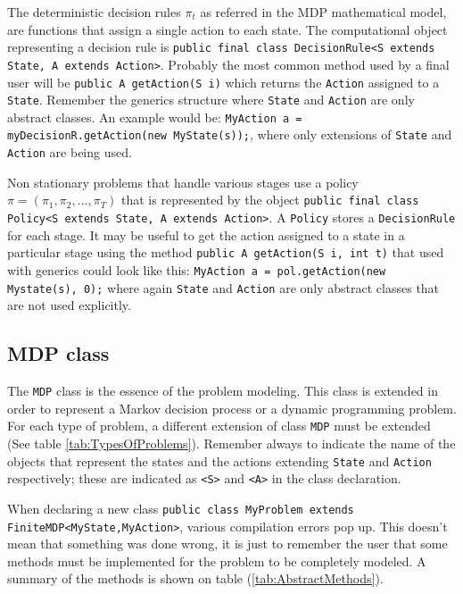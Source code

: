 \documentclass[11pt]{article}
\begin{document}
The deterministic decision rules $\pi_t$ as referred in the MDP mathematical model, are functions that assign a single action to each state. The computational object representing a decision rule is \lstinline!public final class DecisionRule<S extends State, A extends Action>!. Probably the most common method used by a final user will be \lstinline!public A getAction(S i)! which returns the \lstinline!Action! assigned to a \lstinline!State!. Remember the generics structure where \lstinline!State! and \lstinline!Action! are only abstract classes. An example would be: \lstinline!MyAction a = myDecisionR.getAction(new MyState(s));!, where only extensions of \lstinline!State! and \lstinline!Action! are being used.

Non stationary problems that handle various stages use a policy $\pi=(\pi_1, \pi_2,\ldots,\pi_T)$ that is represented by the object \lstinline!public final class Policy<S extends State, A extends Action>!. A \lstinline!Policy! stores a \lstinline!DecisionRule! for each stage. It may be useful to get the action assigned to a state in a particular stage using the method \lstinline!public A getAction(S i, int t)! that used with generics could look like this: \lstinline!MyAction a = pol.getAction(new Mystate(s), 0);! where again \lstinline!State! and \lstinline!Action! are only abstract classes that are not used explicitly.

\subsection{MDP class}

The \lstinline!MDP! class is the essence of the problem modeling. This class is extended in order to represent a Markov decision process or a dynamic programming problem. For each type of problem, a different extension of class \lstinline!MDP! must be extended (See table \ref{tab:TypesOfProblems}). Remember always to indicate the name of the objects that represent the states and the actions extending \lstinline!State! and \lstinline!Action! respectively; these are indicated as \lstinline!<S>! and \lstinline!<A>! in the class declaration.

When declaring a new class \lstinline!public class MyProblem extends FiniteMDP<MyState,MyAction>!, various compilation errors pop up. This doesn't mean that something was done wrong, it is just to remember the user that some methods must be implemented for the problem to be completely modeled. A summary of the methods is shown on table (\ref{tab:AbstractMethods}).
\end{document}
